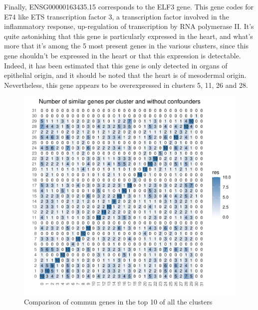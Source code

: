 \documentclass[a4paper, 11pt]{article}
\begin{document}
\begin{multicols}{2}
Finally, ENSG00000163435.15 corresponds to the ELF3 gene. This gene codes for E74 like ETS transcription factor 3, a transcription factor involved in the inflammatory response, up-regulation of transcription by RNA polymerase II. It's quite astonishing that this gene is particularly expressed in the heart, and what's more that it's among the 5 most present genes in the various clusters, since this gene shouldn't be expressed in the heart or that this expression is detectable. Indeed, it has been estimated that this gene is only detected in organs of epithelial origin, and it should be noted that the heart is of mesodermal origin. Nevertheless, this gene appears to be overexpressed in clusters 5, 11, 26 and 28.

\begin{figure}[H]
	\centering
	\includegraphics[width=\columnwidth]{figures/final_analysis/SimilGenes}
	\caption{Comparison of commun genes in the top 10 of all the clusters}
	\label{fig:similGenes}
\end{figure}



\end{multicols}
\end{document}
